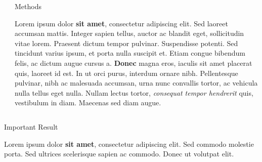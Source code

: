 \documentclass[final]{beamer}
\newlength{\onecolwid}
\newlength{\twocolwid}
\begin{document}
\begin{frame}[t]
\begin{columns}[t]
\begin{column}{\twocolwid}
\begin{columns}[t,totalwidth=\twocolwid]
\begin{column}{\onecolwid}
\end{column} %

\begin{column}{\onecolwid}\vspace{-.6in} %


\begin{block}{Methods}

Lorem ipsum dolor \textbf{sit amet}, consectetur adipiscing elit. Sed laoreet accumsan mattis. Integer sapien tellus, auctor ac blandit eget, sollicitudin vitae lorem. Praesent dictum tempor pulvinar. Suspendisse potenti. Sed tincidunt varius ipsum, et porta nulla suscipit et. Etiam congue bibendum felis, ac dictum augue cursus a. \textbf{Donec} magna eros, iaculis sit amet placerat quis, laoreet id est. In ut orci purus, interdum ornare nibh. Pellentesque pulvinar, nibh ac malesuada accumsan, urna nunc convallis tortor, ac vehicula nulla tellus eget nulla. Nullam lectus tortor, \textit{consequat tempor hendrerit} quis, vestibulum in diam. Maecenas sed diam augue.

\end{block}


\end{column} %

\end{columns} %


\begin{alertblock}{Important Result}

Lorem ipsum dolor \textbf{sit amet}, consectetur adipiscing elit. Sed commodo molestie porta. Sed ultrices scelerisque sapien ac commodo. Donec ut volutpat elit.

\end{alertblock} 



\end{column}
\end{columns}
\end{frame}
\end{document}
